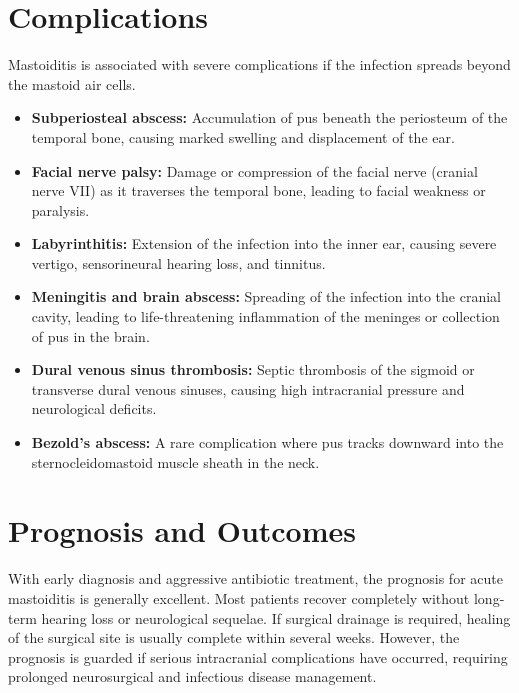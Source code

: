 \section*{Complications}
Mastoiditis is associated with severe complications if the infection spreads beyond the mastoid air cells.
\begin{itemize}
    \item \textbf{Subperiosteal abscess:} Accumulation of pus beneath the periosteum of the temporal bone, causing marked swelling and displacement of the ear.
    \item \textbf{Facial nerve palsy:} Damage or compression of the facial nerve (cranial nerve VII) as it traverses the temporal bone, leading to facial weakness or paralysis.
    \item \textbf{Labyrinthitis:} Extension of the infection into the inner ear, causing severe vertigo, sensorineural hearing loss, and tinnitus.
    \item \textbf{Meningitis and brain abscess:} Spreading of the infection into the cranial cavity, leading to life-threatening inflammation of the meninges or collection of pus in the brain.
    \item \textbf{Dural venous sinus thrombosis:} Septic thrombosis of the sigmoid or transverse dural venous sinuses, causing high intracranial pressure and neurological deficits.
    \item \textbf{Bezold's abscess:} A rare complication where pus tracks downward into the sternocleidomastoid muscle sheath in the neck.
\end{itemize}

\section*{Prognosis and Outcomes}
With early diagnosis and aggressive antibiotic treatment, the prognosis for acute mastoiditis is generally excellent. Most patients recover completely without long-term hearing loss or neurological sequelae. If surgical drainage is required, healing of the surgical site is usually complete within several weeks. However, the prognosis is guarded if serious intracranial complications have occurred, requiring prolonged neurosurgical and infectious disease management.

